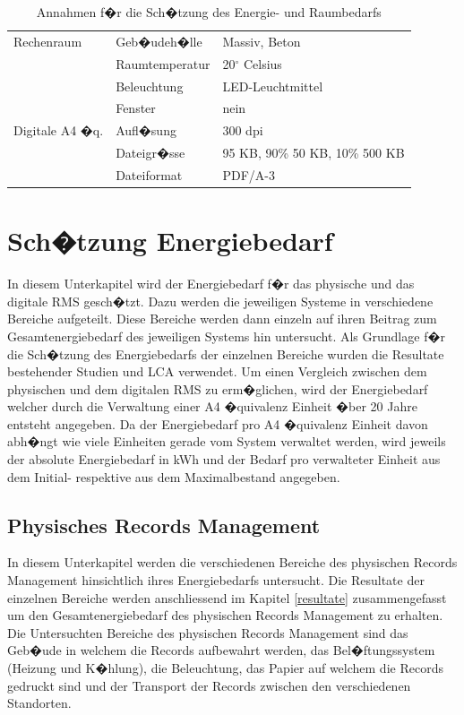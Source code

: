\documentclass[a4paper,twoside,10pt]{report}
\begin{document}
\begin{table}[h]
\begin{tabular}{|l|l|l|}
\hline
Rechenraum		& Geb�udeh�lle 				& Massiv, Beton \\
							& Raumtemperatur& 20$^{\circ}$ Celsius\\
							& Beleuchtung		&	LED-Leuchtmittel \\
							&	Fenster &	nein \\
\hline
Digitale A4 �q. 	& Aufl�sung			& 300 dpi	 \\
										& Dateigr�sse		& 95 KB, 90\% 50 KB, 10\% 500 KB\\
										& Dateiformat & PDF/A-3 \\

\hline
\end{tabular}
\caption{Annahmen f�r die Sch�tzung des Energie- und Raumbedarfs}
\label{tab:anahmen}
\end{table}



\cleardoublepage
\acresetall
\chapter{Sch�tzung Energiebedarf}\label{vgl_energ}
In diesem Unterkapitel wird der Energiebedarf f�r das physische und das digitale \ac{RMS} gesch�tzt. Dazu werden die jeweiligen Systeme in verschiedene Bereiche aufgeteilt. Diese Bereiche werden dann einzeln auf ihren Beitrag zum Gesamtenergiebedarf des jeweiligen Systems hin untersucht. Als Grundlage f�r die Sch�tzung des Energiebedarfs der einzelnen Bereiche wurden die Resultate bestehender Studien und \ac{LCA} verwendet. Um einen Vergleich zwischen dem physischen und dem digitalen \ac{RMS} zu erm�glichen, wird der Energiebedarf welcher durch die Verwaltung einer A4 �quivalenz Einheit �ber 20 Jahre entsteht angegeben. Da der Energiebedarf pro A4 �quivalenz Einheit davon abh�ngt wie viele Einheiten gerade vom System verwaltet werden, wird jeweils der absolute Energiebedarf in kWh und der Bedarf pro verwalteter Einheit aus dem Initial- respektive aus dem Maximalbestand angegeben.

\section{Physisches Records Management}\label{subsec:energ_phys}
In diesem Unterkapitel werden die verschiedenen Bereiche des physischen Records Management hinsichtlich ihres Energiebedarfs untersucht. Die Resultate der einzelnen Bereiche werden anschliessend im Kapitel \ref{resultate} zusammengefasst um den Gesamtenergiebedarf des physischen Records Management zu erhalten. Die Untersuchten Bereiche des physischen Records Management sind das Geb�ude in welchem die Records aufbewahrt werden, das Bel�ftungssystem (Heizung und K�hlung), die Beleuchtung, das Papier auf welchem die Records gedruckt sind und der Transport der Records zwischen den verschiedenen Standorten. 
\end{document}
